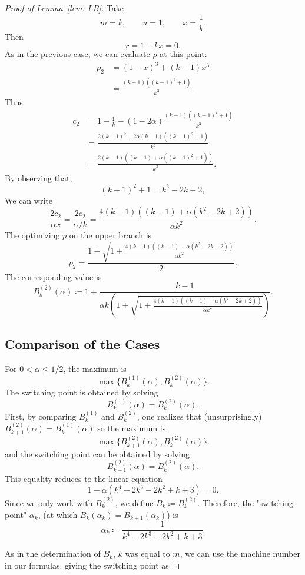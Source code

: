 \documentclass[%
english, titlepage=false %
]{./tum-templates/book/tumbook}
\begin{document}
\begin{proof}[\hypertarget{proof:LB}{Proof of Lemma~\ref{lem: LB}}]
Take
\[
        m=k,\qquad u=1,\qquad x=\frac1k.
\]
Then
\[
        r=1-kx=0.
\]
As in the previous case, we can evaluate \(\rho\) at this point:
\[
\begin{aligned}
\rho_2
&=
(1-x)^3+(k-1)x^3 \\
&=
\frac{(k-1)\left((k-1)^2+1\right)}{k^3}.
\end{aligned}
\]
Thus
\[
\begin{aligned}
c_2
&=
1-\frac1k
-(1-2\alpha)
\frac{(k-1)\left((k-1)^2+1\right)}{k^3} \\
&=
\frac{
2(k-1)^2
 +2\alpha(k-1)\left((k-1)^2+1\right)
}{k^3} \\
&=
\frac{
2(k-1)\left((k-1)+\alpha\left((k-1)^2+1\right)\right)
}{k^3}.
\end{aligned}
\]
By observing that,
\[
        (k-1)^2+1=k^2-2k+2, 
\]
We can write
\[
\frac{2c_2}{\alpha x}
=
\frac{2c_2}{\alpha/k}
=
\frac{
4(k-1)\left((k-1)+\alpha(k^2-2k+2)\right)
}{\alpha k^2}.
\]
The optimizing \(p\) on the upper branch is
\[
\boxed{
p_2
=
\frac{
1+\sqrt{
1+
\frac{
4(k-1)\left((k-1)+\alpha(k^2-2k+2)\right)
}{\alpha k^2}
}
}{2}
.}
\]
The corresponding value is
\[
\boxed{
B^{(2)}_k(\alpha)
\coloneqq
1+
\frac{k-1}{
\alpha k\left(
1+\sqrt{
1+
\frac{
4(k-1)\left((k-1)+\alpha(k^2-2k+2)\right)
}{\alpha k^2}
}
\right)}
.}
\]

\subsection*{Comparison of the Cases}

For \(0<\alpha\leq 1/2\), the maximum is
\[
        \max\{B^{(1)}_k(\alpha),B^{(2)}_k(\alpha)\}.
\]
The switching point is obtained by solving
\[
        B^{(1)}_k(\alpha)=B^{(2)}_k(\alpha).
\]
First, by comparing $B^{(1)}_k$ and $B^{(2)}_k$, one realizes that (unsurprisingly) $B^{(2)}_{k+1}(\alpha)=B^{(1)}_k(\alpha)$
so the maximum is
\[
        \max\{B^{(2)}_{k+1}(\alpha),B^{(2)}_{k}(\alpha)\}.
\]
and the switching point can be obtained by solving
\[
        B^{(2)}_{k+1}(\alpha)=B^{(2)}_{k}(\alpha).
\]
This equality reduces to the linear equation
\[
        1-\alpha\left(k^4-2k^3-2k^2+k+3\right)=0.
\]
Since we only work with $B^{(2)}_k$, we define $B_k \coloneqq B^{(2)}_k$.
Therefore, the "switching point" $\alpha_k$, (at which $B_k(\alpha_k) =B_{k+1}(\alpha_k)$) is
\[
        \alpha_k \coloneqq
        \frac{1}{k^4-2k^3-2k^2+k+3}.
\]

As in the determination of $B_k$, $k$ was equal to $m$, we can use the machine number in our formulas.
giving the switching point as


\end{proof}
\end{document}
